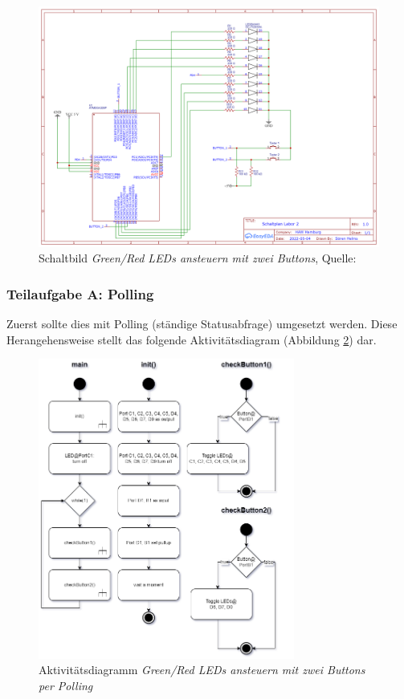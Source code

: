 \documentclass{article}
\begin{document}
\begin{figure}[ht]
    \centering
    \includegraphics[width=\textwidth]{images/A3-Schaltbild.png}
    \caption{Schaltbild \textit{Green/Red LEDs ansteuern mit zwei Buttons}, Quelle: \cite{SchaltbilderS}}
    \label{fig:sb-a3}
\end{figure}

\subsubsection{Teilaufgabe A: Polling}

\noindent Zuerst sollte dies mit Polling (ständige Statusabfrage) umgesetzt werden.
Diese Herangehensweise stellt das folgende Aktivitätsdiagram (Abbildung \ref{fig:ad-a3a}) dar. 

\begin{figure}[ht]
    \centering
    \includegraphics[width=0.75\textwidth]{images/A3a-AD-Polling.png}
    \caption{Aktivitätsdiagramm \textit{Green/Red LEDs ansteuern mit zwei Buttons per Polling}}
    \label{fig:ad-a3a}
\end{figure}
\end{document}
